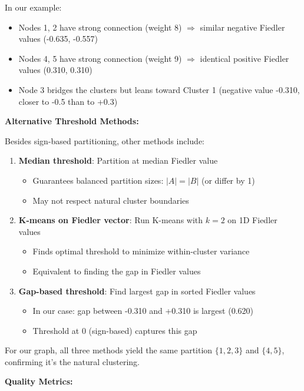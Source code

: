 \documentclass[12pt]{article}
\begin{document}
\begin{explanation}
In our example:
\begin{itemize}
    \item Nodes 1, 2 have strong connection (weight 8) $\Rightarrow$ similar negative Fiedler values (-0.635, -0.557)
    \item Nodes 4, 5 have strong connection (weight 9) $\Rightarrow$ identical positive Fiedler values (0.310, 0.310)
    \item Node 3 bridges the clusters but leans toward Cluster 1 (negative value -0.310, closer to -0.5 than to +0.3)
\end{itemize}

\textbf{Alternative Threshold Methods:}

Besides sign-based partitioning, other methods include:

\begin{enumerate}
    \item \textbf{Median threshold}: Partition at median Fiedler value
    \begin{itemize}
        \item Guarantees balanced partition sizes: $|A| = |B|$ (or differ by 1)
        \item May not respect natural cluster boundaries
    \end{itemize}

    \item \textbf{K-means on Fiedler vector}: Run K-means with $k=2$ on 1D Fiedler values
    \begin{itemize}
        \item Finds optimal threshold to minimize within-cluster variance
        \item Equivalent to finding the gap in Fiedler values
    \end{itemize}

    \item \textbf{Gap-based threshold}: Find largest gap in sorted Fiedler values
    \begin{itemize}
        \item In our case: gap between -0.310 and +0.310 is largest (0.620)
        \item Threshold at 0 (sign-based) captures this gap
    \end{itemize}
\end{enumerate}

For our graph, all three methods yield the same partition $\{1,2,3\}$ and $\{4,5\}$, confirming it's the natural clustering.

\textbf{Quality Metrics:}


\end{explanation}
\end{document}
